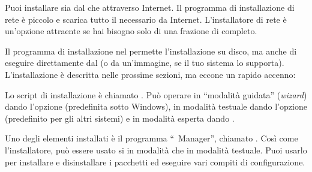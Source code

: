 \documentclass{article}
\begin{document}
Puoi installare \TL{} sia dal \DVD{} che attraverso Internet. Il
programma di installazione di rete è piccolo e scarica tutto il
necessario da Internet. L'installatore di rete è un'opzione
attraente se hai bisogno solo di una frazione di \TL{} completo.

Il programma di installazione nel \DVD{} permette l'installazione su
disco, ma anche di eseguire \TL{} direttamente dal \DVD{} (o da
un'immagine, se il tuo sistema lo supporta). L'installazione è 
descritta nelle prossime sezioni, ma eccone un rapido accenno:

\begin{itemize*}

\item Lo script di installazione è chiamato .
  Può operare in ``modalità guidata'' (\emph{wizard}) dando l'opzione
   (predefinita sotto Windows), in modalità testuale
  dando l'opzione  (predefinito per gli altri sistemi) e
  in modalità \GUI{} esperta dando .

\item Uno degli elementi installati è il programma ``\TL\ Manager'',
  chiamato . Così come l'installatore, può essere usato si in
  modalità \GUI{} che in modalità testuale. Puoi usarlo per installare e
  disinstallare i pacchetti ed eseguire vari compiti di configurazione.

\end{itemize*}
\end{document}
